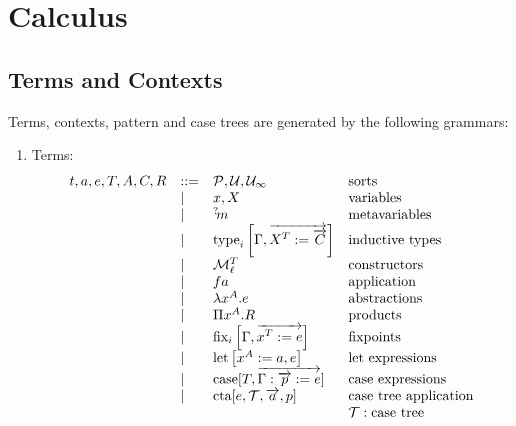 \section{Calculus}





\subsection{Terms and Contexts}


Terms, contexts, pattern and case trees are generated by the following grammars:

\begin{enumerate}
    \item Terms:
        $$
        \begin{array}{lllll} 
            t,a,e,T,A,C,R
            &::=&
            {\mathcal P}, {\mathcal U}, {{\mathcal U}_\infty}
            &\text{sorts}
            \\
            &\mid&
            x, X
            &\text{variables}
            \\
            &\mid&
            {{}^? \kern-0.2em m}
            &\text{metavariables}
            \\
            &\mid&
            {\text{type}}_i\left[ {\Gamma , {\overrightarrow {X^T := {\overrightarrow {C}}}}} \right]
            & \text{inductive types}
            \\
            &\mid&
            {\cal M}^T_{\ell}
            &\text{constructors}
            \\
            &\mid&
            f a
            & \text{application}
            \\
            &\mid&
            \lambda x^A. e
            & \text{abstractions}
            \\
            &\mid&
            \Pi x^A. R
            & \text{products}
            \\
            &\mid&
            {\text{fix}}_i\left[ {\Gamma, {\overrightarrow { x^T := e}}} \right]
            & \text{fixpoints}
            \\
            &\mid&
            {\text{let}}\left[ {x^A := a, e} \right]
            & \text{let expressions}
            \\
            &\mid&
            {\text{case}}[T, {\overrightarrow {\Gamma: {\overrightarrow {p}} := e}}]
            & \text{case expressions}
            \\
            &\mid&
            {\text{cta}}[e, {\mathcal T}, {\overrightarrow {a}}, p]
            &\text{case tree application}
            \\
            &&& {\mathcal T}: \text{case tree}
         \end{array}
        $$


\end{enumerate}
